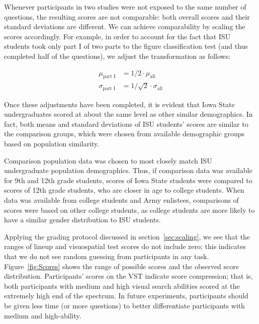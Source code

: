 \documentclass[11pt]{isuthesis}\usepackage[]{graphicx}\usepackage[]{color}
\begin{document}
Whenever participants in two studies were not exposed to the same number of questions, the resulting scores are not comparable: both overall scores and their standard deviations are different. We can achieve comparability by scaling the scores accordingly.
For example, in order to account for the fact that ISU students took only part I of two parts to the figure classification test (and thus completed half of the questions), we adjust the transformation as follows:

\begin{eqnarray*}
\mu_{\text{part I}} &= 1/2 \cdot \mu_{\text{all}}\\
\sigma_{\text{part I}} &= 1/\sqrt{2} \cdot \sigma_{\text{all}}
\end{eqnarray*}


Once these adjustments have been completed, it is evident that Iowa State undergraduates scored at about the same level as other similar demographics. In fact, both means and standard deviations of ISU students' scores are similar to the comparison groups, which were chosen from available demographic groups based on population similarity. 

Comparison population data was chosen to most closely match ISU undergraduate population demographics. Thus, if comparison data was available for 9th and 12th grade students, scores of Iowa State students were compared to scores of 12th grade students, who are closer in age to college students. When data was available from college students and Army enlistees, comparisons of scores were based on other college students, as college students are more likely to have a similar gender distribution to ISU students.

Applying the grading protocol discussed in section~\ref{sec:scaling}, we see that the ranges of lineup and visuospatial test scores do not include zero; this indicates that we do not see random guessing from participants in any task. Figure~\ref{fig:Scores} shows the range of possible scores and the observed score distribution. 
Participants' scores on the VST indicate score compression; that is, both participants with medium and high visual search abilities scored at the extremely high end of the spectrum. 
In future experiments, participants should be given less time (or more questions) to better differentiate participants with medium and high-ability.
\end{document}
